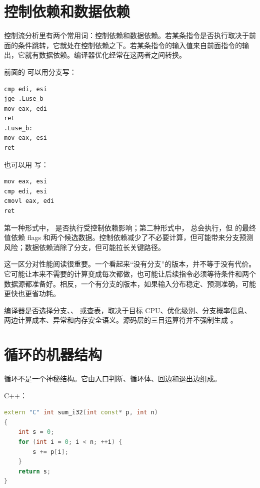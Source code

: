 \section{控制依赖和数据依赖}

控制流分析里有两个常用词：控制依赖和数据依赖。若某条指令是否执行取决于前面的条件跳转，它就处在控制依赖之下。若某条指令的输入值来自前面指令的输出，它就有数据依赖。编译器优化经常在这两者之间转换。

前面的  可以用分支写：

\begin{lstlisting}
cmp edi, esi
jge .Luse_b
mov eax, edi
ret
.Luse_b:
mov eax, esi
ret
\end{lstlisting}

也可以用  写：

\begin{lstlisting}
mov eax, esi
cmp edi, esi
cmovl eax, edi
ret
\end{lstlisting}

第一种形式中， 是否执行受控制依赖影响；第二种形式中， 总会执行，但  的最终值依赖 flags 和两个候选数据。控制依赖减少了不必要计算，但可能带来分支预测风险；数据依赖消除了分支，但可能拉长关键路径。

这一区分对性能阅读很重要。一个看起来“没有分支”的版本，并不等于没有代价。它可能让本来不需要的计算变成每次都做，也可能让后续指令必须等待条件和两个数据源都准备好。相反，一个有分支的版本，如果输入分布稳定、预测准确，可能更快也更省功耗。

\begin{deepdive}
编译器是否选择分支、、 或查表，取决于目标 CPU、优化级别、分支概率信息、两边计算成本、异常和内存安全语义。源码层的三目运算符并不强制生成 。
\end{deepdive}

\section{循环的机器结构}

循环不是一个神秘结构。它由入口判断、循环体、回边和退出边组成。

C++：

\begin{lstlisting}[language=C++]
extern "C" int sum_i32(int const* p, int n)
{
    int s = 0;
    for (int i = 0; i < n; ++i) {
        s += p[i];
    }
    return s;
}
\end{lstlisting}

